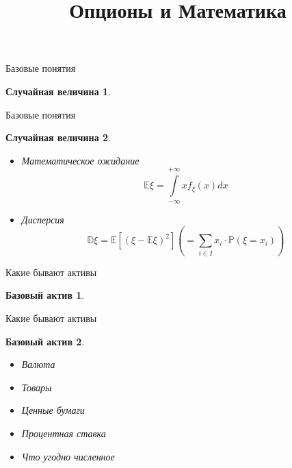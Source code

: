 \documentclass{beamer}
\title[Опционы и Математика]{Опционы и Математика} %
\institute[Sber] %
    {
        \\

        \centering\Large{Ваня Воробьев}\\
        \vspace{0.5cm}
        \begin{center}
            \small
            \href{https://t.me/v0r0bi0v}{t.me/v0r0bi0v} | \href{tel:+79779996957}{+79779996957} | \href{mailto:ievorobev@edu.hse.ru}{IEVorobyev@sberbank.ru}
        \end{center}
    }
\newtheorem*{randomvariable*}{Случайная величина}
\newtheorem{underlying*}{Базовый актив}
\newcommand{\E}{\ensuremath{\mathbb{E}}}
\newcommand{\D}{\ensuremath{\mathbb{D}}}
\renewcommand{\P}{\ensuremath{\mathbb{P}}}
\begin{document}
        \begin{frame}
            \titlepage
        \end{frame}

        \begin{frame}{Базовые понятия}
            \begin{randomvariable*}

            \end{randomvariable*}
        \end{frame}

        \begin{frame}{Базовые понятия}
            \begin{randomvariable*}
                \begin{itemize}
                    \item Математическое ожидание
                    \[
                        \E \xi = \int\limits_{-\infty}^{+\infty} xf_{\xi}(x) dx
                    \]
                    \item Дисперсия
                    \[
                        \D \xi = \E\left[(\xi - \E \xi)^2\right] \left( = \sum\limits_{i\in I} x_i \cdot \P(\xi = x_i) \right)
                    \]
                \end{itemize}
            \end{randomvariable*}
        \end{frame}

        \begin{frame}{Какие бывают активы}
            \begin{underlying*}
            \end{underlying*}
        \end{frame}

        \begin{frame}{Какие бывают активы}
            \begin{underlying*}
                \begin{itemize}
                    \item Валюта
                    \item Товары
                    \item Ценные бумаги
                    \item Процентная ставка
                    \item Что угодно численное
                \end{itemize}
            \end{underlying*}
        \end{frame}
\end{document}
